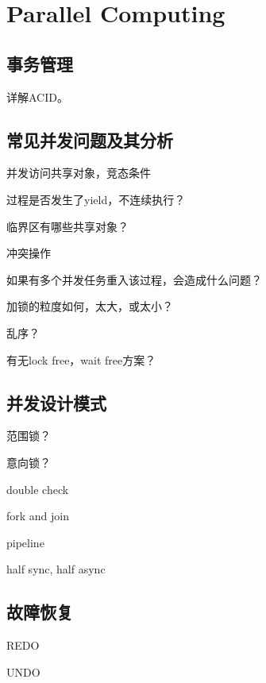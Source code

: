 \chapter{Parallel Computing}

\section{事务管理}

详解ACID。

\section{常见并发问题及其分析}

并发访问共享对象，竞态条件

\begin{enumbox}
\item 过程是否发生了yield，不连续执行？
\item 临界区有哪些共享对象？
\item 冲突操作
\item 如果有多个并发任务重入该过程，会造成什么问题？
\item 加锁的粒度如何，太大，或太小？
\item 乱序？
\item 有无lock free，wait free方案？
\end{enumbox}

\section{并发设计模式}

范围锁？

意向锁？

\begin{compactitem}
    \item double check
    \item fork and join
    \item pipeline
    \item half sync, half async
\end{compactitem}

\section{故障恢复}

REDO

UNDO
